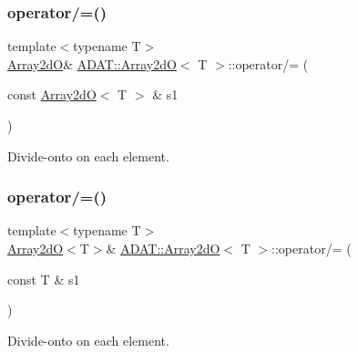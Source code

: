 \subsubsection{\texorpdfstring{operator/=()}{operator/=()}\hspace{0.1cm}{\footnotesize\ttfamily [3/6]}}
{\footnotesize\ttfamily template$<$typename T$>$ \\
\mbox{\hyperlink{classADAT_1_1Array2dO}{Array2dO}}\& \mbox{\hyperlink{classADAT_1_1Array2dO}{A\+D\+A\+T\+::\+Array2dO}}$<$ T $>$\+::operator/= (\begin{DoxyParamCaption}\item[{const \mbox{\hyperlink{classADAT_1_1Array2dO}{Array2dO}}$<$ T $>$ \&}]{s1 }\end{DoxyParamCaption})\hspace{0.3cm}{\ttfamily [inline]}}



Divide-\/onto on each element. 

\mbox{\label{classADAT_1_1Array2dO_ae0c954c51dfb1165b2afdd6152417fcf}} 
\subsubsection{\texorpdfstring{operator/=()}{operator/=()}\hspace{0.1cm}{\footnotesize\ttfamily [4/6]}}
{\footnotesize\ttfamily template$<$typename T$>$ \\
\mbox{\hyperlink{classADAT_1_1Array2dO}{Array2dO}}$<$T$>$\& \mbox{\hyperlink{classADAT_1_1Array2dO}{A\+D\+A\+T\+::\+Array2dO}}$<$ T $>$\+::operator/= (\begin{DoxyParamCaption}\item[{const T \&}]{s1 }\end{DoxyParamCaption})\hspace{0.3cm}{\ttfamily [inline]}}



Divide-\/onto on each element. 

\mbox{\label{classADAT_1_1Array2dO_ae0c954c51dfb1165b2afdd6152417fcf}} 
